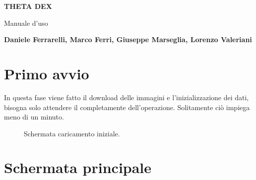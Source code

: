 \documentclass[a4paper,11pt]{article}
\begin{document}
\begin{titlepage}
   \begin{center}
       \vspace*{1cm}
 
       \textbf{THETA DEX}
 
       \vspace{0.5cm}
        Manuale d'uso
 
       \vspace{5cm}
 
       \textbf{Daniele Ferrarelli, Marco Ferri, Giuseppe Marseglia, Lorenzo Valeriani}
 
       \vfill
   \end{center}
\end{titlepage}

  \section{Primo avvio}
  In questa fase viene fatto il download delle immagini e l’inizializzazione dei dati, bisogna solo attendere il completamente dell’operazione. Solitamente ciò impiega meno di un minuto.
  \begin{figure}[h!]
    \centering
  \caption{Schermata caricamento iniziale.}
\end{figure}
\newpage

  \section{Schermata principale}
\end{document}
